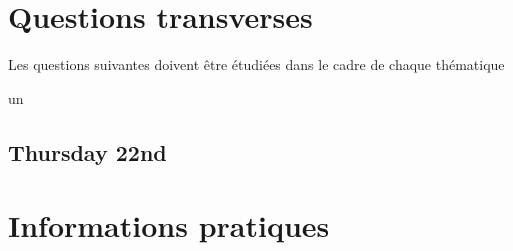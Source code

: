 \documentclass[openany, parskip=full, 12pt, a4]{scrbook}
\begin{document}
\chapter{Questions transverses}

Les questions suivantes doivent être étudiées dans le cadre de chaque thématique

\begin{description}
\item un


\end{description}

\section{Thursday 22nd}

\chapter{Informations pratiques}




\newpage

\end{document}
